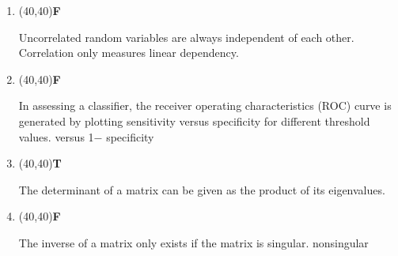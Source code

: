 \documentclass[11pt,twoside]{article}
\newcommand{\?}{\stackrel{?}{=}}
\newcommand{\ol}{\overline}
\newcommand{\bl}{\color{blue}}
\begin{document}
\begin{enumerate}[\bf (i)]
 
    \smallskip

\item \hfill
  \begin{minipage}{.1\linewidth}
    \framebox(40,40){\bf\bl F} %
  \end{minipage}\quad
  \begin{minipage}{.85\linewidth}
    Uncorrelated random variables are always independent of each other. {\bl Correlation only measures linear dependency.}
  \end{minipage}
  
  
    \smallskip

\item \hfill
  \begin{minipage}{.1\linewidth}
    \framebox(40,40){\bf\bl F} %
  \end{minipage}\quad
  \begin{minipage}{.85\linewidth}
    In assessing a classifier, the receiver operating characteristics (ROC) curve is generated by plotting sensitivity
    versus specificity for different threshold values. {\bl versus 1$-$ specificity}
  \end{minipage}

  \smallskip
    
  \item \hfill
  \begin{minipage}{.1\linewidth}
    \framebox(40,40){\bf\bl T} %
  \end{minipage}\quad
  \begin{minipage}{.85\linewidth}
    The determinant of a matrix can be given as the product of its eigenvalues.
  \end{minipage}

  \smallskip
  
 

  
\item \hfill
  \begin{minipage}{.1\linewidth}
    \framebox(40,40){\bf\bl F} %
  \end{minipage}\quad
  \begin{minipage}{.85\linewidth}
    The inverse of a matrix only exists if the matrix is singular. {\bl nonsingular }
  \end{minipage}


\end{enumerate}
\end{document}
